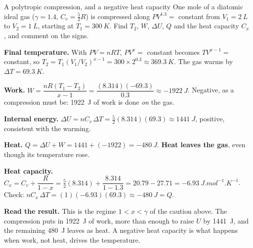 \begin{figure}[htbp]
\centering
{}
\end{figure}

\begin{exbox}{A polytropic compression, and a negative heat capacity}\label{ex:thermo-polytropic}
One mole of a diatomic ideal gas ($\gamma=1.4$, $C_v=\tfrac52R$) is compressed along $PV^{1.3}=$ constant
from $V_1=\SI{2}{L}$ to $V_2=\SI{1}{L}$, starting at $T_1=\SI{300}{K}$. Find $T_2$, $W$, $\Delta U$, $Q$ and
the heat capacity $C_x$, and comment on the signs.

 \textbf{Final temperature.} With $PV=nRT$, $PV^x=$ constant becomes $TV^{x-1}=$ constant, so
$T_2=T_1(V_1/V_2)^{x-1}=300\times2^{0.3}\approx\SI{369.3}{K}$. The gas warms by $\Delta T=\SI{69.3}{K}$.

 \textbf{Work.} $W=\dfrac{nR(T_1-T_2)}{x-1}=\dfrac{(8.314)(-69.3)}{0.3}\approx\SI{-1922}{J}$.
Negative, as a compression must be: \SI{1922}{J} of work is done \emph{on} the gas.

 \textbf{Internal energy.} $\Delta U=nC_v\,\Delta T=\tfrac52(8.314)(69.3)\approx\SI{+1441}{J}$,
positive, consistent with the warming.

 \textbf{Heat.} $Q=\Delta U+W=1441+(-1922)=\SI{-480}{J}$. \textbf{Heat leaves the gas}, even though
its temperature rose.

 \textbf{Heat capacity.} $C_x=C_v+\dfrac{R}{1-x}=\tfrac52(8.314)+\dfrac{8.314}{1-1.3}
=20.79-27.71=\SI{-6.93}{J.mol^{-1}.K^{-1}}$. Check: $nC_x\,\Delta T=(1)(-6.93)(69.3)\approx\SI{-480}{J}=Q$.

 \textbf{Read the result.} This is the regime $1<x<\gamma$ of the caution above. The compression
puts in \SI{1922}{J} of work, more than enough to raise $U$ by \SI{1441}{J}, and the remaining
\SI{480}{J} leaves as heat. A negative heat capacity is what happens when work, not heat, drives the
temperature.
\end{exbox}

